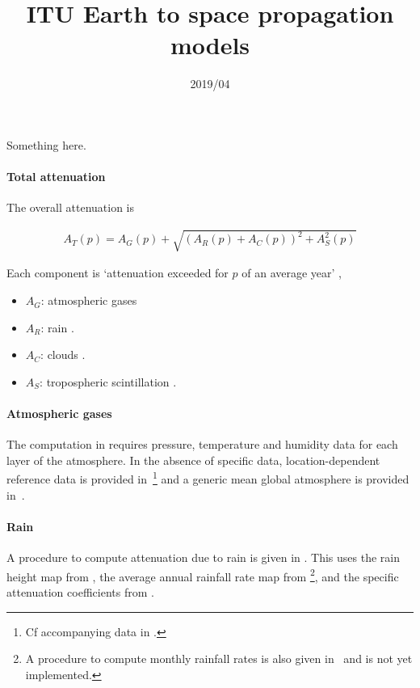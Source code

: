 \documentclass[10pt,notitlepage,oneside]{article}
\begin{document}
\title{ITU Earth to space propagation models}
\date{2019/04 \textendash{} }
\maketitle

Something here.

\paragraph{Total attenuation}

The overall attenuation is \cite[(60)]{ITU-P.618-13}

\begin{align}
  A_T(p) = A_G(p) + \sqrt{(A_R(p) + A_C(p))^2 + A_S^2(p)}
\end{align}

Each component is ‘attenuation exceeded for $p$ of an average year’ \cite[\S2.2.2.1 Step 9]{ITU-P.618-13},

\begin{itemize}
\item $A_G$: atmospheric gases \cite[(20)]{ITU-P.676-11}
\item $A_R$: rain \cite[(8)]{ITU-P.618-13}.
\item $A_C$: clouds \cite{ITU-P.840-7}.
\item $A_S$: tropospheric scintillation \cite[(46)]{ITU-P.618-13}.
\end{itemize}

\paragraph{Atmospheric gases}

The computation in \cite[(20)]{ITU-P.676-11} requires pressure, temperature and humidity data for each layer of the atmosphere. In the absence of specific data, location-dependent reference data is provided in~\cite[Annex~2]{ITU-P.835-6}\footnote{Cf accompanying data in \cite{ITU-prop-soft}.} and a generic mean global atmosphere is provided in~\cite[Annex~1]{ITU-P.835-6}.

\paragraph{Rain} A procedure to compute attenuation due to rain is given in \cite[\S2.2.1.1]{ITU-P.618-13}. This uses the rain height map from \cite[\S2.2.1.1]{ITU-P.839-4}, the average annual rainfall rate map from \cite{ITU-P.837-7}\footnote{A procedure to compute monthly rainfall rates is also given in~\cite{ITU-P.837-7} and is not yet implemented.\todo{}}, and the specific attenuation coefficients from \cite{ITU-P.838-3}.

\cite{ITU-P.676-11}

\cite{ITU-e2s-val}

\small



\tableofcontents
\printindex

\todos
\end{document}
